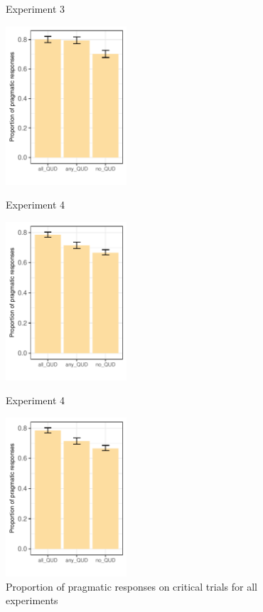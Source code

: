 \documentclass[12pt]{article}
\begin{document}
\begin{figure}[!ht]  
\begin{minipage}{.32\textwidth}
    \caption*{Experiment 3}
    \includegraphics[height=5.9cm]{img/exp3_proportion_pragmatic.pdf}    
    \end{minipage}%
\begin{minipage}{.32\textwidth}
    \caption*{Experiment 4}
    \includegraphics[height=5.9cm]{img/exp4_proportion_pragmatic.pdf}    
    \end{minipage}%
\begin{minipage}{.32\textwidth}
    \caption*{Experiment 4}
    \includegraphics[height=5.9cm]{img/exp4_proportion_pragmatic.pdf}
    \end{minipage}%
    \caption{Proportion of pragmatic responses on critical trials for all experiments}
\end{figure}
\end{document}
